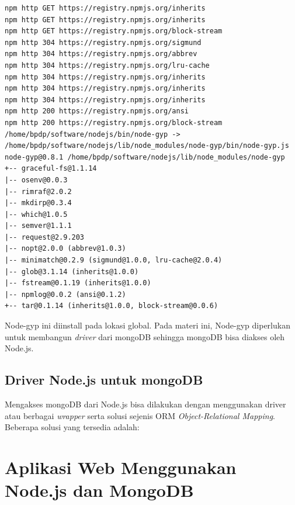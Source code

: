 \begin{lstlisting}
npm http GET https://registry.npmjs.org/inherits
npm http GET https://registry.npmjs.org/inherits
npm http GET https://registry.npmjs.org/block-stream
npm http 304 https://registry.npmjs.org/sigmund
npm http 304 https://registry.npmjs.org/abbrev
npm http 304 https://registry.npmjs.org/lru-cache
npm http 304 https://registry.npmjs.org/inherits
npm http 304 https://registry.npmjs.org/inherits
npm http 304 https://registry.npmjs.org/inherits
npm http 200 https://registry.npmjs.org/ansi
npm http 200 https://registry.npmjs.org/block-stream
/home/bpdp/software/nodejs/bin/node-gyp -> /home/bpdp/software/nodejs/lib/node_modules/node-gyp/bin/node-gyp.js
node-gyp@0.8.1 /home/bpdp/software/nodejs/lib/node_modules/node-gyp
+-- graceful-fs@1.1.14
|-- osenv@0.0.3
|-- rimraf@2.0.2
|-- mkdirp@0.3.4
|-- which@1.0.5
|-- semver@1.1.1
|-- request@2.9.203
|-- nopt@2.0.0 (abbrev@1.0.3)
|-- minimatch@0.2.9 (sigmund@1.0.0, lru-cache@2.0.4)
|-- glob@3.1.14 (inherits@1.0.0)
|-- fstream@0.1.19 (inherits@1.0.0)
|-- npmlog@0.0.2 (ansi@0.1.2)
+-- tar@0.1.14 (inherits@1.0.0, block-stream@0.0.6)
\end{lstlisting}

Node-gyp ini diinstall pada lokasi global. Pada materi ini, Node-gyp diperlukan untuk membangun \textit{driver} dari mongoDB sehingga mongoDB bisa diakses oleh Node.js. 

\subsection{Driver Node.js untuk mongoDB}

Mengakses mongoDB dari Node.js bisa dilakukan dengan menggunakan driver atau berbagai \textit{wrapper} serta solusi sejenis ORM \textit{Object-Relational Mapping}. Beberapa solusi yang tersedia adalah:





\section{Aplikasi Web Menggunakan Node.js dan MongoDB}

